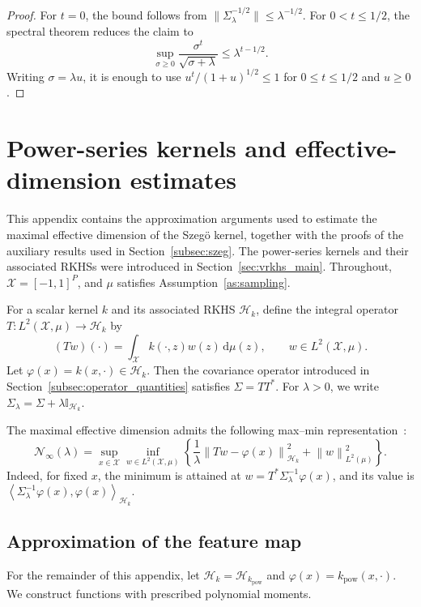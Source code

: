 \documentclass[11pt]{article}
\numberwithin{equation}{section}
\theoremstyle{plain}
\theoremstyle{definition}
\theoremstyle{remark}
\newcommand{\X}{\mathcal{X}}
\newcommand{\Hs}{\mathcal{H}}
\newcommand{\I}{\mathbb{I}}
\newcommand{\norm}[1]{\left\lVert#1\right\rVert}
\newcommand{\innerpro}[1]{\left\langle#1\right\rangle}
\begin{document}
\begin{proof}
For $t=0$, the bound follows from
$\|\Sigma_\lambda^{-1/2}\|\leq\lambda^{-1/2}$. For
$0<t\leq1/2$, the spectral theorem reduces the claim to
\[
\sup_{\sigma\geq0}\frac{\sigma^t}{\sqrt{\sigma+\lambda}}
\leq\lambda^{t-1/2}.
\]
Writing $\sigma=\lambda u$, it is enough to use
$u^t/(1+u)^{1/2}\leq1$ for $0\leq t\leq1/2$ and $u\geq0$.
\end{proof}

\section{Power-series kernels and effective-dimension estimates}
\label{app:analytic_kernels}

This appendix contains the approximation arguments used to estimate the
maximal effective dimension of the Szegö kernel, together with the proofs of
the auxiliary results used in Section~\ref{subsec:szeg}. The power-series
kernels and their associated RKHSs were introduced in
Section~\ref{sec:vrkhs_main}. Throughout, $\X=[-1,1]^P$, and $\mu$ satisfies
Assumption~\ref{as:sampling}.

For a scalar kernel $k$ and its associated RKHS $\Hs_k$, define the integral
operator $T\colon L^2(\X,\mu)\to\Hs_k$ by
\[
(Tw)(\cdot)
=
\int_{\X} k(\cdot,z)w(z)\,\mathrm{d}\mu(z),
\qquad
w\in L^2(\X,\mu).
\]
Let $\varphi(x)=k(x,\cdot)\in\Hs_k$. Then the covariance operator introduced
in Section~\ref{subsec:operator_quantities} satisfies
$\Sigma=TT^*$. For $\lambda>0$, we write
$\Sigma_\lambda=\Sigma+\lambda\I_{\Hs_k}$.

The maximal effective dimension admits the following max--min
representation~\cite[Lemma~5.12]{dommel2024bound}:
\begin{equation}
\mathcal{N}_{\infty}(\lambda)
=
\sup_{x\in\X}
\inf_{w\in L^2(\X,\mu)}
\left\{
\frac{1}{\lambda}
\norm{Tw-\varphi(x)}_{\Hs_k}^2
+
\norm{w}_{L^2(\mu)}^2
\right\}.
\label{eq:max_dof_maxmin}
\end{equation}
Indeed, for fixed $x$, the minimum is attained at
$w=T^*\Sigma_\lambda^{-1}\varphi(x)$, and its value is
$\innerpro{\Sigma_\lambda^{-1}\varphi(x),\varphi(x)}_{\Hs_k}$.

\subsection{Approximation of the feature map}

For the remainder of this appendix, let
$\Hs_k=\Hs_{k_{\mathrm{pow}}}$ and
$\varphi(x)=k_{\mathrm{pow}}(x,\cdot)$. We construct functions with prescribed
polynomial moments.
\end{document}

